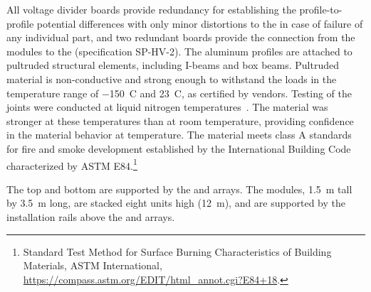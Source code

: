 All voltage divider boards provide redundancy for establishing the profile-to-profile potential differences with only minor distortions to the \efield in case of failure of any individual part, and two redundant boards provide the connection from the  modules to the  
(specification SP-HV-2).  
The aluminum profiles are attached to  pultruded structural elements, including I-beams and box beams.  
Pultruded  material is non-conductive and strong enough to withstand the  loads  in the temperature range of \SI{-150}{C} and \SI{23}{C}, as certified by vendors. Testing of the  joints were conducted at liquid nitrogen temperatures~\cite{bib:docdb1504}. 
The material was stronger at these temperatures than at room temperature, 
providing confidence in the material behavior at \lar  temperature. The  material meets class A standards for fire and smoke development established by the International Building Code characterized by ASTM E84.\footnote{Standard Test Method for Surface Burning Characteristics of Building Materials, ASTM International, \url{https://compass.astm.org/EDIT/html_annot.cgi?E84+18}.}

The top and bottom  %
are supported by the  and  arrays. The  modules, 
\SI{1.5}{\m} tall by \SI{3.5}{\m} long, are stacked eight units high (\SI{12}{\m}), and are supported by the installation rails above the  and  arrays.



